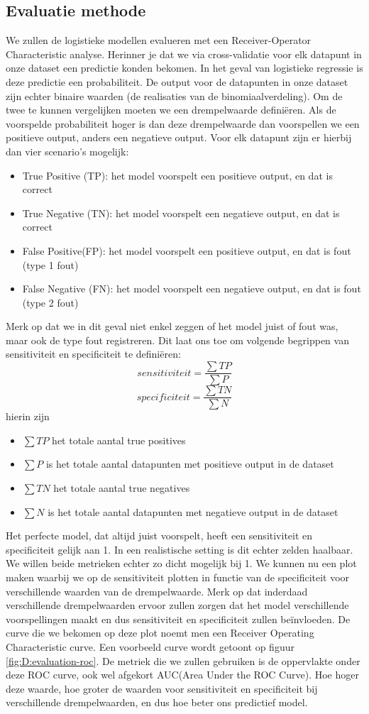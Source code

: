 \subsection{Evaluatie methode}
We zullen de logistieke modellen evalueren met een Receiver-Operator Characteristic analyse. Herinner je dat we via cross-validatie voor elk datapunt in onze dataset een predictie konden bekomen. In het geval van logistieke regressie is deze predictie een probabiliteit. De output voor de datapunten in onze dataset zijn echter binaire waarden (de realisaties van de binomiaalverdeling). Om de twee te kunnen vergelijken moeten we een drempelwaarde defini\"eren. Als de voorspelde probabiliteit hoger is dan deze drempelwaarde dan voorspellen we een positieve output, anders een negatieve output. Voor elk datapunt zijn er hierbij dan vier scenario's mogelijk:
\begin{itemize}
	\item True Positive (TP): het model voorspelt een positieve output, en dat is correct
	\item True Negative (TN): het model voorspelt een negatieve output, en dat is correct
	\item False Positive(FP): het model voorspelt een positieve output, en dat is fout (type 1 fout)
	\item False Negative (FN): het model voorspelt een negatieve output, en dat is fout (type 2 fout)
\end{itemize}
Merk op dat we in dit geval niet enkel zeggen of het model juist of fout was, maar ook de type fout registreren. Dit laat ons toe om volgende begrippen van sensitiviteit en specificiteit te defini\"eren:
$$
sensitiviteit = \frac{\sum{TP}}{\sum{P}}
$$
$$
specificiteit = \frac{\sum{TN}}{\sum{N}}
$$
hierin zijn
\begin{itemize}
	\item $\sum{TP}$ het totale aantal true positives
	\item $\sum{P}$ is het totale aantal datapunten met positieve output in de dataset
	\item $\sum{TN}$ het totale aantal true negatives
	\item $\sum{N}$ is het totale aantal datapunten met negatieve output in de dataset
\end{itemize}
Het perfecte model, dat altijd juist voorspelt, heeft een sensitiviteit en specificiteit gelijk aan 1. In een realistische setting is dit echter zelden haalbaar. We willen beide metrieken echter zo dicht mogelijk bij 1. We kunnen nu een plot maken waarbij we op de sensitiviteit plotten in functie van de specificiteit voor verschillende waarden van de drempelwaarde. Merk op dat inderdaad verschillende drempelwaarden ervoor zullen zorgen dat het model verschillende voorspellingen maakt en dus sensitiviteit en specificiteit zullen be\"invloeden. De curve die we bekomen op deze plot noemt men een Receiver Operating Characteristic curve. Een voorbeeld curve wordt getoont op figuur \ref{fig:D:evaluation-roc}. De metriek die we zullen gebruiken is de oppervlakte onder deze ROC curve, ook wel afgekort AUC(Area Under the ROC Curve). Hoe hoger deze waarde, hoe groter de waarden voor sensitiviteit en specificiteit bij verschillende drempelwaarden, en dus hoe beter ons predictief model.
